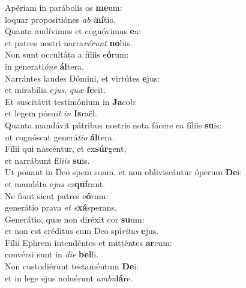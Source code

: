 \evenverse Apériam in parábolis os \textbf{me}um:~\*\\
\evenverse loquar propositiónes \textit{ab} \textit{i}\textbf{ní}tio.\\
\oddverse Quanta audívimus et cognóvimus \textbf{e}a:~\*\\
\oddverse et patres nostri narra\textit{vé}\textit{runt} \textbf{no}bis.\\
\evenverse Non sunt occultáta a fíliis e\textbf{ó}rum:~\*\\
\evenverse in generati\textit{ó}\textit{ne} \textbf{ál}tera.\\
\oddverse Narrántes laudes Dómini, et virtútes \textbf{e}jus:~\*\\
\oddverse et mirabília e\textit{jus}, \textit{quæ} \textbf{fe}cit.\\
\evenverse Et suscitávit testimónium in \textbf{Ja}cob:~\*\\
\evenverse et legem pósu\textit{it} \textit{in} \textbf{Is}raël.\\
\oddverse Quanta mandávit pátribus nostris nota fácere ea fíliis \textbf{su}is:~\*\\
\oddverse ut cognóscat generá\textit{ti}\textit{o} \textbf{ál}tera.\\
\evenverse Fílii qui nascéntur, et ex\textbf{súr}gent,~\*\\
\evenverse et narrábunt fí\textit{li}\textit{is} \textbf{su}is.\\
\oddverse Ut ponant in Deo spem suam, et non obliviscántur óperum \textbf{De}i:~\*\\
\oddverse et mandáta e\textit{jus} \textit{ex}\textbf{quí}rant.\\
\evenverse Ne fiant sicut patres e\textbf{ó}rum:~\*\\
\evenverse generátio prava \textit{et} \textit{e}\textbf{xá}sperans.\\
\oddverse Generátio, quæ non diréxit cor \textbf{su}um:~\*\\
\oddverse et non est créditus cum Deo spí\textit{ri}\textit{tus} \textbf{e}jus.\\
\evenverse Fílii Ephrem intendéntes et mitténtes \textbf{ar}cum:~\*\\
\evenverse convérsi sunt in \textit{di}\textit{e} \textbf{bel}li.\\
\oddverse Non custodiérunt testaméntum \textbf{De}i:~\*\\
\oddverse et in lege ejus noluérunt \textit{am}\textit{bu}\textbf{lá}re.\\
